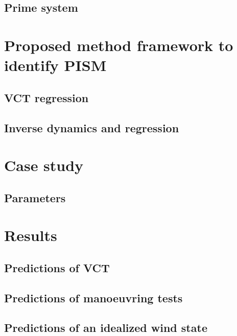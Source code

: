 \documentclass[preprint,12pt,authoryear]{elsarticle}
\begin{document}
\subsection{Prime system}
\label{sec:prime_system}


\FloatBarrier
%
%
%
\section{Proposed method framework to identify PISM}
\label{sec:methodology}

\FloatBarrier

\subsection{VCT regression}
\label{sec:VCT_regression}

\FloatBarrier
%
\subsection{Inverse dynamics and regression}
\label{sec:inverse_dynamics}

\FloatBarrier
%
%
%
\section{Case study}
\label{sec:case_study}

\FloatBarrier
\subsection{Parameters}
\label{sec:parameters}

\FloatBarrier
%
%
%
\section{Results}
\label{sec:results}

%
\subsection{Predictions of VCT}
\label{sec:result_VCT}

\FloatBarrier
%
\subsection{Predictions of manoeuvring tests}
\label{sec:result_MDL}

\FloatBarrier
%
\subsection{Predictions of an idealized wind state}
\label{sec:idealized_wind_state}

\FloatBarrier
%
\end{document}
